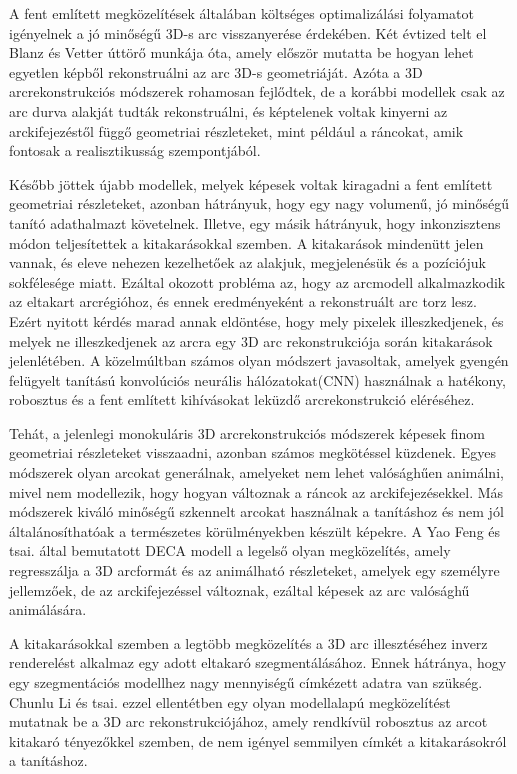 \documentclass[12pt,a4]{article}
\begin{document}
        A fent említett megközelítések általában költséges optimalizálási folyamatot igényelnek a jó minőségű 3D-s arc visszanyerése érdekében. Két évtized telt el \cite{blanzvetter}Blanz és Vetter úttörő munkája óta, amely először mutatta be hogyan lehet egyetlen képből rekonstruálni az arc 3D-s geometriáját. Azóta a 3D arcrekonstrukciós módszerek rohamosan fejlődtek, de a korábbi modellek csak az arc durva alakját tudták rekonstruálni, és képtelenek voltak kinyerni az arckifejezéstől függő geometriai részleteket, mint például a ráncokat, amik fontosak a realisztikusság szempontjából.

        Később jöttek újabb modellek, melyek képesek voltak kiragadni a fent említett geometriai részleteket, azonban hátrányuk, hogy egy nagy volumenű, jó minőségű tanító adathalmazt követelnek. Illetve, egy másik hátrányuk, hogy inkonzisztens módon teljesítettek a kitakarásokkal szemben. A kitakarások mindenütt jelen vannak, és eleve nehezen kezelhetőek az alakjuk, megjelenésük és a pozíciójuk sokfélesége miatt. Ezáltal okozott probléma az, hogy az arcmodell alkalmazkodik az eltakart arcrégióhoz, és ennek eredményeként a rekonstruált arc torz lesz. Ezért nyitott kérdés marad annak eldöntése, hogy mely pixelek illeszkedjenek, és melyek ne illeszkedjenek az arcra egy 3D arc rekonstrukciója során kitakarások jelenlétében. A közelmúltban számos olyan módszert javasoltak, amelyek gyengén felügyelt tanítású konvolúciós neurális hálózatokat(CNN) használnak a hatékony, robosztus és a fent említett kihívásokat leküzdő arcrekonstrukció eléréséhez.

        Tehát, a jelenlegi monokuláris 3D arcrekonstrukciós módszerek képesek finom geometriai részleteket visszaadni, azonban számos megkötéssel küzdenek. Egyes módszerek olyan arcokat generálnak, amelyeket nem lehet valósághűen animálni, mivel nem modellezik, hogy hogyan változnak a ráncok az arckifejezésekkel. Más módszerek kiváló minőségű szkennelt arcokat használnak a tanításhoz és nem jól általánosíthatóak a természetes körülményekben készült képekre. A \cite{deca}Yao Feng és tsai. által bemutatott DECA modell a legelső olyan megközelítés, amely regresszálja a 3D arcformát és az animálható részleteket, amelyek egy személyre jellemzőek, de az arckifejezéssel változnak, ezáltal képesek az arc valósághű animálására.

        A kitakarásokkal szemben a legtöbb megközelítés a 3D arc illesztéséhez inverz renderelést alkalmaz egy adott eltakaró szegmentálásához. Ennek hátránya, hogy egy szegmentációs modellhez nagy mennyiségű címkézett adatra van szükség. Chunlu Li és tsai. \cite{focus} ezzel ellentétben egy olyan modellalapú megközelítést mutatnak be a 3D arc rekonstrukciójához, amely rendkívül robosztus az arcot kitakaró tényezőkkel szemben, de nem igényel semmilyen címkét a kitakarásokról a tanításhoz.
\end{document}
